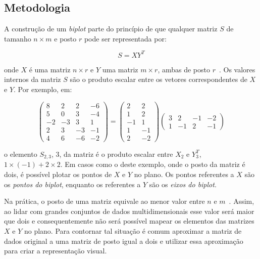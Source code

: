 \subsection{Metodologia}

A construção de um \emph{biplot} parte do princípio de que qualquer
matriz $S$ de tamanho $n \times m$ e posto $r$  pode
ser representada por:

\begin{equation}\label{eq:bp}
    S = XY^T
\end{equation}

onde $X$ é uma matriz $n \times r$ e $Y$ uma matriz $m
\times r$, ambas de posto $r$~\cite{Gabriel1971}. Os valores
internos da matriz $S$ são o produto escalar entre os
vetores correspondentes de $X$ e $Y$. Por exemplo, em:

\begin{equation}
    \left( \begin{array}{rrrr}
        8 &  2 &  2 & -6 \\
        5 &  0 &  3 & -4 \\
       -2 & -3 &  3 &  1 \\
            2 &  3 & -3 & -1 \\
        4 &  6 & -6 & -2\end{array}
\right) = \left( \begin{array}{rr}
         2 & 2 \\
         1 & 2 \\
        -1 & 1 \\
         1 & -1 \\
         2 & -2\end{array} 
\right) \left( \begin{array}{rrrr}
        3 &  2 &-1 & -2 \\
    1 & -1 & 2 & -1 \end{array} 
\right)
\end{equation}

o elemento $S_{2,3}$, 3, da matriz é o
produto escalar entre $X_2$ e $Y^T_3$, $1 \times \left( -1
\right) + 2 \times 2$. Em casos como o deste
exemplo, onde o posto da matriz é dois, é possível plotar os
pontos de $X$ e $Y$ no plano. Os pontos referentes a $X$ são
os \emph{pontos do biplot}, enquanto os referentes a $Y$ são
os \emph{eixos do biplot}.

Na prática, o posto de uma matriz equivale ao menor valor
entre $n$ e $m$~\cite{Greenacre2010}. Assim, ao lidar com
grandes conjuntos de dados multidimensionais esse valor será
maior que dois e consequentemente não será possível mapear
os elementos das matrizes $X$ e $Y$ no plano. Para contornar
tal situação é comum aproximar a matriz de dados original a
uma matriz de posto igual a dois e utilizar essa aproximação
para criar a representação visual.

